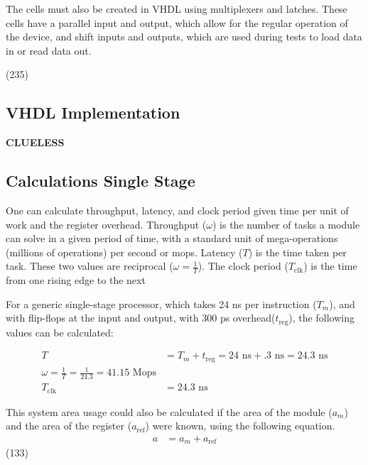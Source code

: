 \documentclass[11pt]{article}
\begin{document}
The cells must also be created in VHDL using multiplexers and latches. 
These cells have a parallel input and output, which allow for the regular operation of the device, and shift inputs and outputs, which are used during tests to load data in or read data out.

(235)


\subsection{VHDL Implementation}
\textbf{CLUELESS}

\subsection{Calculations Single Stage} \label{sec:single}

One can calculate throughput, latency, and clock period given time per unit of work and the register overhead.
Throughput ($\omega$) is the number of tasks a module can solve in a given period of time, with a standard unit of mega-operations (millions of operations) per second or mops\cite{dally}.
Latency ($T$) is the time taken per task\cite{dally}. 
These two values are reciprocal ($\omega = \frac{1}{T}$).
The clock period ($T_{\text{clk}}$) is the time from one rising edge to the next

For a generic single-stage processor, which takes 24 ns per instruction ($T_m$), and with flip-flops at the input and output, with 300 ps overhead($t_{\text{reg}}$), the following values can be calculated:

\begin{align}
    T &= T_m + t_{\text{reg}} = 24\text{ ns} + .3\text{ ns} = 24.3\text{ ns}\\
    \omega = \frac{1}{T} = \frac{1}{24.3} = 41.15\text{ Mops}\\
    T_{\text{clk}} &= 24.3\text{ ns}
\end{align}

This system area usage could also be calculated if the area of the module ($a_m$) and the area of the register ($a_{\text{ref}}$) were known, using the following equation.
\begin{align}
    a &= a_m + a_{\text{ref}}
\end{align}
(133)
\end{document}
